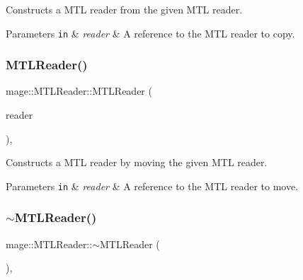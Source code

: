 Constructs a M\+TL reader from the given M\+TL reader.


\begin{DoxyParams}[1]{Parameters}
\mbox{\tt in}  & {\em reader} & A reference to the M\+TL reader to copy. \\
\hline
\end{DoxyParams}
\hypertarget{classmage_1_1_m_t_l_reader_a436d06f44afe2d6a275119223ebf5f1f}{}\label{classmage_1_1_m_t_l_reader_a436d06f44afe2d6a275119223ebf5f1f} 
\subsubsection{\texorpdfstring{M\+T\+L\+Reader()}{MTLReader()}\hspace{0.1cm}{\footnotesize\ttfamily [3/3]}}
{\footnotesize\ttfamily mage\+::\+M\+T\+L\+Reader\+::\+M\+T\+L\+Reader (\begin{DoxyParamCaption}\item[{\hyperlink{classmage_1_1_m_t_l_reader}{M\+T\+L\+Reader} \&\&}]{reader }\end{DoxyParamCaption})\hspace{0.3cm}{\ttfamily [default]}, {\ttfamily [noexcept]}}

Constructs a M\+TL reader by moving the given M\+TL reader.


\begin{DoxyParams}[1]{Parameters}
\mbox{\tt in}  & {\em reader} & A reference to the M\+TL reader to move. \\
\hline
\end{DoxyParams}
\hypertarget{classmage_1_1_m_t_l_reader_a9d3216b2637bc9402d37c7438860f542}{}\label{classmage_1_1_m_t_l_reader_a9d3216b2637bc9402d37c7438860f542} 
\subsubsection{\texorpdfstring{$\sim$\+M\+T\+L\+Reader()}{~MTLReader()}}
{\footnotesize\ttfamily mage\+::\+M\+T\+L\+Reader\+::$\sim$\+M\+T\+L\+Reader (\begin{DoxyParamCaption}{ }\end{DoxyParamCaption})\hspace{0.3cm}{\ttfamily [virtual]}, {\ttfamily [default]}}

